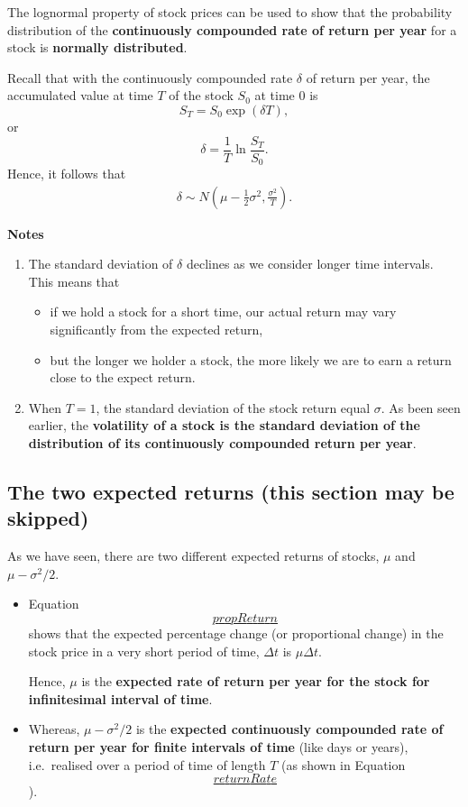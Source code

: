 \documentclass[
]{book}
\theoremstyle{definition}
\theoremstyle{definition}
\theoremstyle{definition}
\theoremstyle{definition}
\theoremstyle{remark}
\begin{document}
The lognormal property of stock prices can be used to show that the
probability distribution of the \textbf{continuously compounded rate of return
per year} for a stock is \textbf{normally distributed}.

Recall that with the continuously compounded rate \(\delta\) of return per
year, the accumulated value at time \(T\) of the stock \(S_0\) at time 0 is
\[S_T = S_0 \exp(\delta T),\] or
\[\delta = \frac{1}{T} \ln \frac{S_T}{S_0}.\] Hence, it follows that
\[\begin{aligned}
\label{returnRate}
     \delta \sim N\left( \mu - \frac{1}{2}\sigma^2 , \frac{\sigma^2}{T} \right).\end{aligned}\]

\textbf{Notes}

\begin{enumerate}
\def\labelenumi{\arabic{enumi}.}
\item
  The standard deviation of \(\delta\) declines as we consider longer
  time intervals. This means that

  \begin{itemize}
  \item
    if we hold a stock for a short time, our actual return may vary
    significantly from the expected return,
  \item
    but the longer we holder a stock, the more likely we are to earn
    a return close to the expect return.
  \end{itemize}
\item
  When \(T = 1\), the standard deviation of the stock return equal
  \(\sigma\). As been seen earlier, the \textbf{volatility of a stock is the
  standard deviation of the distribution of its continuously
  compounded return per year}.
\end{enumerate}

\hypertarget{the-two-expected-returns-this-section-may-be-skipped}{%
\subsection{The two expected returns (this section may be skipped)}\label{the-two-expected-returns-this-section-may-be-skipped}}

As we have seen, there are two different expected returns of stocks,
\(\mu\) and \(\mu - \sigma^2/2\).

\begin{itemize}
\item
  Equation \protect\hyperlink{propReturn}{\[propReturn\]} shows that the expected percentage change
  (or proportional change) in the stock price in a very short period
  of time, \(\Delta t\) is \(\mu \Delta t\).

  Hence, \(\mu\) is the \textbf{expected rate of return per year for the stock
  for infinitesimal interval of time}.
\item
  Whereas, \(\mu - \sigma^2/2\) is the \textbf{expected continuously
  compounded rate of return per year for finite intervals of time}
  (like days or years), i.e.~realised over a period of time of length
  \(T\) (as shown in Equation
  \protect\hyperlink{returnRate}{\[returnRate\]}).
\end{itemize}
\end{document}
